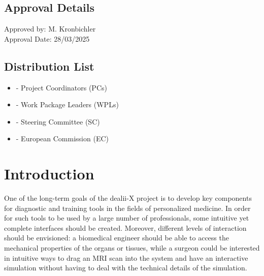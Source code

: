 \documentclass[a4paper,12pt]{article}
\begin{document}
\subsection*{{Approval Details}}
Approved by: M. Kronbichler \\
Approval Date: 28/03/2025

\subsection*{{Distribution List}}
\begin{itemize}
    \item [] - Project Coordinators (PCs)
    \item [] - Work Package Leaders (WPLs)
    \item [] - Steering Committee (SC)
    \item [] - European Commission (EC)
\end{itemize}

\vspace*{2cm}

\disclaimer

\newpage

\tableofcontents %

\newpage


\section{\textcolor{EUblue}{Introduction}}

One of the long-term goals of the dealii-X project is to develop key components for diagnostic and training tools in the fields of personalized medicine. In order for such tools to be used by a large number of professionals, some intuitive yet complete interfaces should be created. Moreover, different levels of interaction should be envisioned: a biomedical engineer should be able to access the mechanical properties of the organs or tissues, while a surgeon could be interested in intuitive ways to drag an MRI scan into the system and have an interactive simulation without having to deal with the technical details of the simulation.
\end{document}
